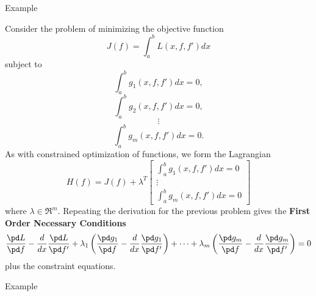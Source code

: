 \noindent Example

\newpage
Consider the problem of minimizing the objective function
$$ J(f) = \int_a^b L(x, f, f') dx$$
subject to
$$ \int_a^b g_1(x, f, f')dx = 0,$$
$$ \int_a^b g_2(x, f, f')dx = 0,$$
$$\vdots$$
$$ \int_a^b g_m(x, f, f')dx = 0.$$
As with constrained optimization of functions, we form the Lagrangian
$$H(f) = J(f) + \lambda^T\left[ \begin{array}{c}\int_a^b g_1(x, f, f')dx = 0 \\ \vdots \\ \int_a^b g_m(x, f, f')dx = 0 \end{array}\right]$$ where $\lambda \in \Re^m$. Repeating the derivation for the previous problem
 gives the {\bf First Order Necessary Conditions}
 $$\frac{\pd L}{\pd f}- \frac{d}{dx}\frac{\pd L}{\pd f'}+\lambda_1 \left( \frac{\pd g_1}{\pd f}- \frac{d}{dx} \frac{\pd g_1}{\pd f'}\right) + \cdots + \lambda_m \left( \frac{\pd g_m}{\pd f}- \frac{d}{dx} \frac{\pd g_m}{\pd f'}\right)= 0$$
 plus the constraint equations.
 
 \medskip
 \noindent Example
 
 \newpage
